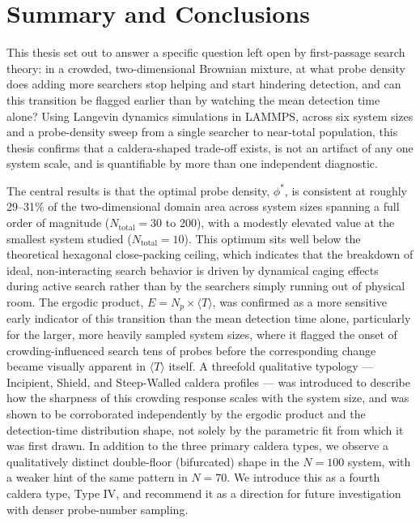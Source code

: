 \chapter{Summary and Conclusions}
\label{chap:5}
This thesis set out to answer a specific question left open by first-passage search theory: in a crowded, two-dimensional Brownian mixture, at what probe density does adding more searchers stop helping and start hindering detection, and can this transition be flagged earlier than by watching the mean detection time alone? Using Langevin dynamics simulations in LAMMPS, across six system sizes and a probe-density sweep from a single searcher to near-total population, this thesis confirms that a caldera-shaped trade-off exists, is not an artifact of any one system scale, and is quantifiable by more than one independent diagnostic.

The central results is that the optimal probe density, $\phi^*$, is consistent at roughly 29--31\% of the two-dimensional domain area across system sizes spanning a full order of magnitude ($N_\text{total} =30$ to 200), with a modestly elevated value at the smallest system studied ($N_\text{total}=10$). This optimum sits well below the theoretical hexagonal close-packing ceiling, which indicates that the breakdown of ideal, non-interacting search behavior is driven by dynamical caging effects during active search rather than by the searchers simply running out of physical room. The ergodic product, $E = N_p \times \langle T \rangle$, was confirmed as a more sensitive early indicator of this transition than the mean detection time alone, particularly for the larger, more heavily sampled system sizes, where it flagged the onset of crowding-influenced search tens of probes before the corresponding change became visually apparent in $\langle T \rangle$ itself. A threefold qualitative typology --- Incipient, Shield, and Steep-Walled caldera profiles --- was introduced to describe how the sharpness of this crowding response scales with the system size, and was shown to be corroborated independently by the ergodic product and the detection-time distribution shape, not solely by the parametric fit from which it was first drawn. In addition to the three primary caldera types, we observe a qualitatively distinct double-floor (bifurcated) shape in the $N=100$ system, with a weaker hint of the same pattern in $N=70$. We introduce this as a fourth caldera type, Type IV, and recommend it as a direction for future investigation with denser probe-number sampling.

